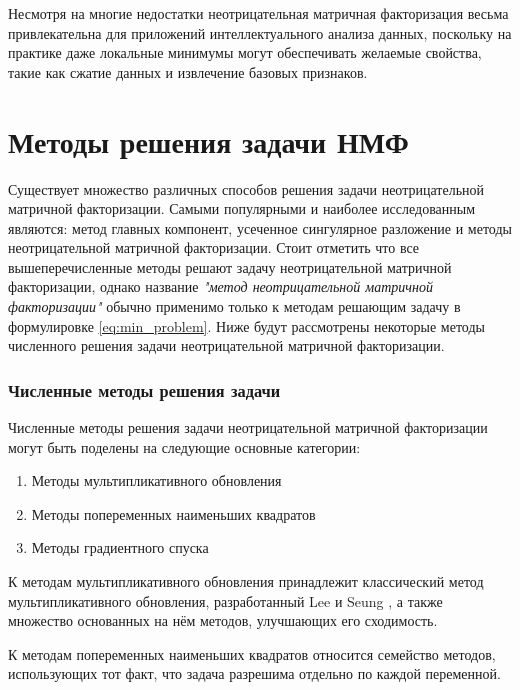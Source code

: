 Несмотря на многие недостатки неотрицательная матричная факторизация весьма привлекательна для приложений интеллектуального анализа данных,
поскольку на практике даже локальные минимумы могут обеспечивать желаемые свойства, такие как сжатие данных и извлечение базовых признаков.





\newpage





\section{Методы решения задачи НМФ}

Существует множество различных способов решения задачи неотрицательной матричной факторизации.
Самыми популярными и наиболее исследованным являются: метод главных компонент, усеченное сингулярное разложение и методы неотрицательной матричной факторизации.
Стоит отметить что все вышеперечисленные методы решают задачу неотрицательной матричной факторизации,
однако название \textit{"метод неотрицательной матричной факторизации"} обычно применимо только к методам решающим задачу в формулировке \eqref{eq:min_problem}.
Ниже будут рассмотрены некоторые методы численного решения задачи неотрицательной матричной факторизации.

\subsubsection{Численные методы решения задачи}
Численные методы решения задачи неотрицательной матричной факторизации
могут быть поделены на следующие основные категории:
\begin{enumerate}
	\item Методы мультипликативного обновления
	\item Методы попеременных наименьших квадратов
	\item Методы градиентного спуска
\end{enumerate}

К методам мультипликативного обновления принадлежит классический метод мультипликативного обновления,
разработанный Lee и Seung \cite{lee_seung},
а также множество основанных на нём методов, улучшающих его сходимость.

К методам попеременных наименьших квадратов относится семейство методов,
использующих тот факт, что задача разрешима отдельно по каждой переменной.

